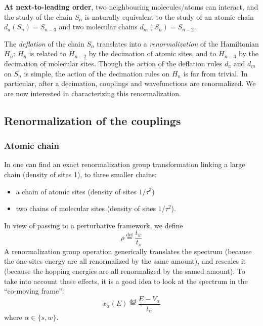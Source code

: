 \documentclass[11pt]{article}
\newcommand{\define}{\ensuremath{ \overset{\text{def}}{=} }}
\begin{document}
\textbf{At next-to-leading order}, two neighbouring molecules/atoms can interact, and the study of the chain $S_n$ is naturally equivalent to the study of an atomic chain $d_a(S_n) = S_{n-3}$ and two molecular chains $d_m(S_n) = S_{n-2}$. 

The \textit{deflation} of the chain $S_n$ translates into a \textit{renormalization} of the Hamiltonian $H_n$: $H_n$ is related to $H_{n-2}$ by the decimation of atomic sites, and to $H_{n-3}$ by the decimation of molecular sites. 
Though the action of the deflation rules $d_a$ and $d_m$ on $S_n$ is simple, the action of the decimation rules on $H_n$ is far from trivial.
In particular, after a decimation, couplings and wavefunctions are renormalized. We are now interested in characterizing this renormalization.

\subsection{Renormalization of the couplings}

\subsubsection{Atomic chain}

In \cite{Zhong1991} one can find an exact renormalization group transformation linking a large chain (density of sites 1), to three smaller chains:
\begin{itemize}
	\item a chain of atomic sites (density of sites $1/\tau^3$)
	\item two chains of molecular sites (density of sites $1/\tau^2$).
\end{itemize}

In view of passing to a perturbative framework, we define
\begin{equation}
	\rho \define \frac{t_w}{t_s}
\end{equation}
A renormalization group operation generically translates the spectrum (because the one-sites energy are all renormalized by the same amount), and rescales it (because the hopping energies are all renormalized by the samed amount).
To take into account these effects, it is a good idea to look at the spectrum in the ``co-moving frame'':
\begin{equation}
	x_{\alpha}(E) \define \frac{E - V_{\alpha}}{t_{\alpha}}
\end{equation}
where $\alpha \in \{ s, w \}$.
\end{document}
